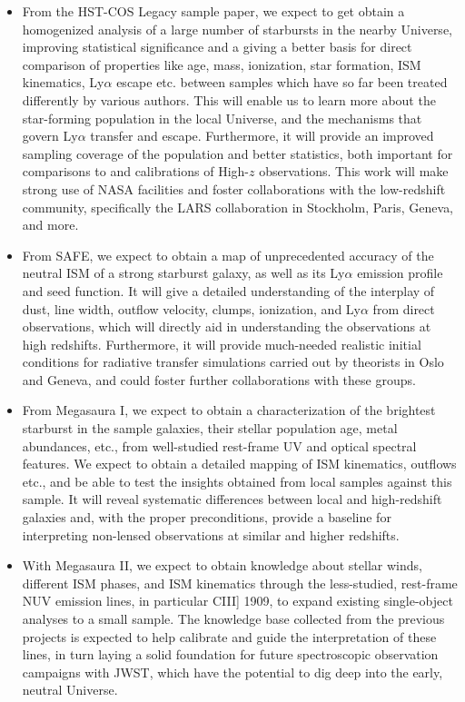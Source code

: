 \documentclass[12pt]{amsart}
\begin{document}
\begin{itemize}
\item From the HST-COS Legacy sample paper, we expect to get obtain a 
	homogenized analysis of a large number of starbursts in the nearby 
	Universe, improving statistical significance and a giving a better 
	basis for direct comparison of properties like age, mass, ionization, 
	star formation, ISM kinematics, Ly$\alpha$ escape etc. between samples 
	which have so far been treated differently by various authors.  
	This will enable us to learn 
	more about the star-forming population in the local Universe, and the 
	mechanisms that govern Ly$\alpha$ transfer and escape. Furthermore, it 
	will provide an improved sampling coverage of the population and better 
	statistics, both important for comparisons to and calibrations of 
	High-$z$ observations. This work will make strong use of NASA facilities 
	and foster collaborations with the low-redshift community, specifically 
	the LARS collaboration in Stockholm, Paris, Geneva, and more. 
\item From SAFE, we expect to obtain a map of unprecedented accuracy of the 
	neutral ISM of a strong starburst galaxy, as well as its Ly$\alpha$
	emission profile and seed function. It will give a detailed
	understanding of the interplay of dust, line width, outflow velocity,
	clumps, ionization, and Ly$\alpha$ from direct observations, which
	will directly aid in understanding the observations at high redshifts. 
	Furthermore, it will provide much-needed realistic initial conditions 
	for radiative transfer simulations carried out by theorists in
	Oslo and Geneva, and could foster further collaborations
	with these groups. 
\item From Megasaura I, we expect to obtain a characterization
	of the brightest starburst in the sample galaxies, their stellar
	population age, metal abundances, etc., from well-studied rest-frame UV 
	and optical spectral features. We expect to obtain a detailed mapping
	of ISM kinematics, outflows etc., and be able to test the
	insights obtained from local samples against this sample. 
	It will reveal systematic differences between local and
	high-redshift galaxies and, with the proper preconditions, provide a 
	baseline for interpreting non-lensed observations at similar and higher
	redshifts. 
\item With Megasaura II, we expect to obtain knowledge about stellar winds,
	different ISM phases, and ISM kinematics through the less-studied,
        rest-frame NUV emission lines, in particular C\textsc{III}] 1909, to 
	expand existing single-object analyses to a small sample. The knowledge 
	base collected from the previous projects is expected to help calibrate 
	and guide the interpretation of these lines, in turn laying a solid 
	foundation for future spectroscopic observation campaigns with JWST, 
	which have the potential to dig deep into the early, neutral Universe. 
\end{itemize}


%

\begin{scriptsize}
	
\end{scriptsize}
\end{document}
